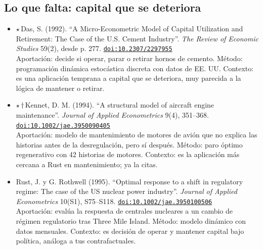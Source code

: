 \documentclass[11pt]{article}
\begin{document}
\subsection*{Lo que falta: capital que se deteriora}
\begin{itemize}
\item $\star$\,Das, S. (1992). ``A Micro-Econometric Model of Capital Utilization and Retirement: The Case of the U.S. Cement Industry''. \textit{The Review of Economic Studies} 59(2), desde p. 277. \href{https://doi.org/10.2307/2297955}{\texttt{doi:10.2307/2297955}}\\
Aportación: decide si operar, parar o retirar hornos de cemento. Método: programación dinámica estocástica discreta con datos de EE. UU. Contexto: es una aplicación temprana a capital que se deteriora, muy parecida a la lógica de mantener o retirar.
\item $\star$\,$\dagger$\,Kennet, D. M. (1994). ``A structural model of aircraft engine maintenance''. \textit{Journal of Applied Econometrics} 9(4), 351--368. \href{https://doi.org/10.1002/jae.3950090405}{\texttt{doi:10.1002/jae.3950090405}}\\
Aportación: modelo de mantenimiento de motores de avión que no explica las historias antes de la desregulación, pero sí después. Método: paro óptimo regenerativo con 42 historias de motores. Contexto: es la aplicación más cercana a Rust en mantenimiento; ya la citas.
\item Rust, J. y G. Rothwell (1995). ``Optimal response to a shift in regulatory regime: The case of the US nuclear power industry''. \textit{Journal of Applied Econometrics} 10(S1), S75--S118. \href{https://doi.org/10.1002/jae.3950100506}{\texttt{doi:10.1002/jae.3950100506}}\\
Aportación: evalúa la respuesta de centrales nucleares a un cambio de régimen regulatorio tras Three Mile Island. Método: modelo dinámico con datos mensuales. Contexto: es decisión de operar y mantener capital bajo política, análoga a tus contrafactuales.
\end{itemize}
\end{document}
